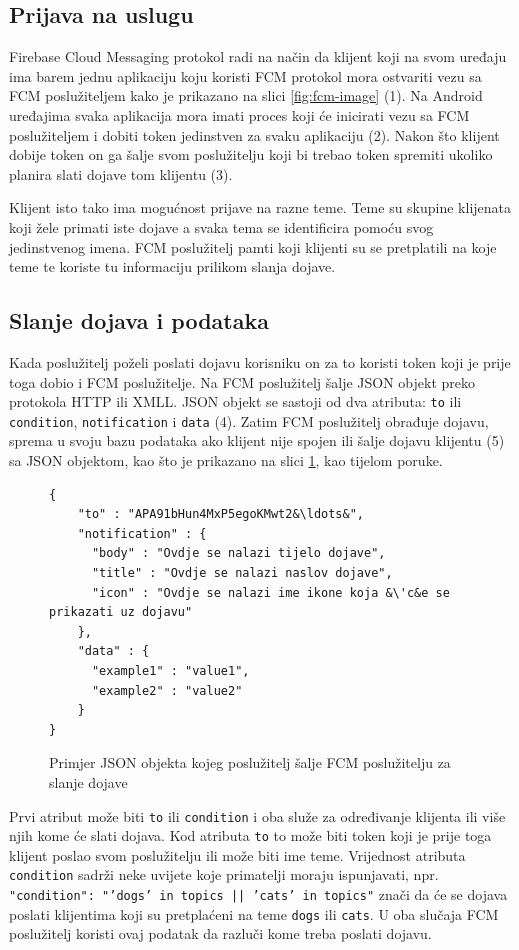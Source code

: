 \documentclass[times, utf8, zavrsni]{fer}
\begin{document}
{\subsection{Prijava na uslugu}
Firebase Cloud Messaging protokol radi na način da klijent koji na svom uređaju ima barem jednu aplikaciju koju koristi FCM protokol mora ostvariti vezu sa FCM poslužiteljem kako je prikazano na slici \ref{fig:fcm-image} (1). Na Android uređajima svaka aplikacija mora imati proces koji će inicirati vezu sa FCM poslužiteljem i dobiti token jedinstven za svaku aplikaciju (2). Nakon što klijent dobije token on ga šalje svom poslužitelju koji bi trebao token spremiti ukoliko planira slati dojave tom klijentu (3). 

Klijent isto tako ima mogućnost prijave na razne teme. Teme su skupine klijenata koji žele primati iste dojave a svaka tema se identificira pomoću svog jedinstvenog imena. FCM poslužitelj pamti koji klijenti su se pretplatili na koje teme te koriste tu informaciju prilikom slanja dojave.

\subsection{Slanje dojava i podataka}
Kada poslužitelj poželi poslati dojavu korisniku on za to koristi token koji je prije toga dobio i FCM poslužitelje. Na FCM poslužitelj šalje JSON objekt preko protokola HTTP ili XMLL. JSON objekt se sastoji od dva atributa: {\tt to}  ili {\tt condition}, {\tt notification} i {\tt data} (4). Zatim FCM poslužitelj obrađuje dojavu, sprema u svoju bazu podataka ako klijent nije spojen ili šalje dojavu klijentu (5) sa JSON objektom, kao što je prikazano na slici \ref{lst:json-dojava}, kao tijelom poruke.

\begin{figure}
\begin{lstlisting}
{
    "to" : "APA91bHun4MxP5egoKMwt2&\ldots&",
    "notification" : {
      "body" : "Ovdje se nalazi tijelo dojave",
      "title" : "Ovdje se nalazi naslov dojave",
      "icon" : "Ovdje se nalazi ime ikone koja &\'c&e se prikazati uz dojavu"
    },
    "data" : {
      "example1" : "value1",
      "example2" : "value2"
    }
}
\end{lstlisting}
\caption{Primjer JSON objekta kojeg poslužitelj šalje FCM poslužitelju za slanje dojave}
\label{lst:json-dojava}
\end{figure}

Prvi atribut može biti {\tt to} ili {\tt condition} i oba služe za određivanje klijenta ili više njih kome će slati dojava. Kod atributa {\tt to} to može biti token koji je prije toga klijent poslao svom poslužitelju ili može biti ime teme. Vrijednost atributa {\tt condition} sadrži neke uvijete koje primatelji moraju ispunjavati, npr. {\tt "condition": "'dogs' in topics || 'cats' in topics"} znači da će se dojava poslati klijentima koji su pretplaćeni na teme {\tt dogs}  ili {\tt cats}. U oba slučaja FCM poslužitelj koristi ovaj podatak da razluči kome treba poslati dojavu.

}
\end{document}
